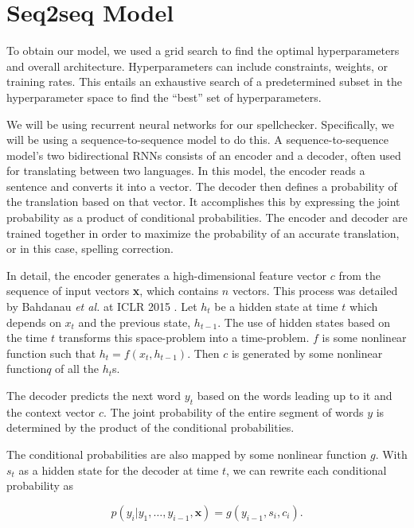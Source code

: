 \documentclass[11pt,a4paper]{scrartcl}
\theoremstyle{definition}
\begin{document}
\section{Seq2seq Model}

To obtain our model, we used a grid search to find the optimal hyperparameters and overall architecture. Hyperparameters can include constraints, weights, or training rates. This entails an exhaustive search of a predetermined subset in the hyperparameter space to find the “best” set of hyperparameters.\newline

We will be using recurrent neural networks for our spellchecker. Specifically, we will be using a sequence-to-sequence model to do this. A sequence-to-sequence model’s two bidirectional RNNs consists of an encoder and a decoder, often used for translating between two languages. 
In this model, the encoder reads a sentence and converts it into a vector. The decoder then defines a probability of the translation based on that vector. It accomplishes this by expressing the joint probability as a product of conditional probabilities. The encoder and decoder are trained together in order to maximize the probability of an accurate translation, or in this case, spelling correction.\newline

In detail, the encoder generates a high-dimensional feature vector $c$ from the sequence of input vectors \textbf{x}, which contains $n$ vectors. This process was detailed by Bahdanau \emph{et al.} at ICLR 2015 \cite{Bahdanau}. Let $h_t$ be a hidden state at time $t$ which depends on $x_t$ and the previous state, $h_{t-1}$. The use of hidden states based on the time $t$ transforms this space-problem into a time-problem. $f$ is some nonlinear function such that $h_t = f(x_t, h_{t-1})$. Then $c$ is generated by some nonlinear function$q$ of all the $h_t$s. \newline

The decoder predicts the next word $y_t$ based on the words leading up to it and the context vector $c$. The joint probability of the entire segment of words $y$ is determined by the product of the conditional probabilities. \newline

The conditional probabilities are also mapped by some nonlinear function $g$. With $s_t$ as a hidden state for the decoder at time $t$, we can rewrite each conditional probability as

\[p(y_i | y_1,\dots,y_{i-1}, \textbf{x}) = g(y_{i-1},s_i,c_i).\]
\end{document}
